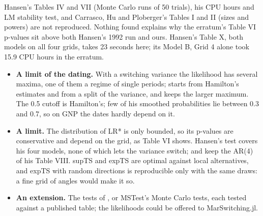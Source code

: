 Hansen's Tables IV and VII (Monte Carlo runs of 50 trials), his CPU hours and LM stability test, and Carrasco, Hu and Ploberger's Tables I and II (sizes and powers) are not reproduced. Nothing found explains why the erratum's Table VI p-values sit above both Hansen's 1992 run and ours. Hansen's Table X, both models on all four grids, takes 23 seconds here; its Model B, Grid 4 alone took 15.9 CPU hours in the erratum.

\begin{itemize}
  \item \textbf{A limit of the dating.} With a switching variance the likelihood has several maxima, one of them a regime of single periods;  starts from Hamilton's estimates and from a split of the variance, and keeps the larger maximum. The 0.5 cutoff is Hamilton's; few of his smoothed probabilities lie between 0.3 and 0.7, so on GNP the dates hardly depend on it.
  \item \textbf{A limit.} The distribution of LR* is only bounded, so its p-values are conservative and depend on the grid, as Table VI shows. Hansen's test covers his four models, none of which lets the variance switch;  and  keep the AR(4) of his Table VIII. supTS and expTS are optimal against local alternatives, and expTS with random directions is reproducible only with the same draws: a fine grid of angles would make it so.
  \item \textbf{An extension.} The tests of , or MSTest's Monte Carlo tests, each tested against a published table; the likelihoods could be offered to MarSwitching.jl.
\end{itemize}

